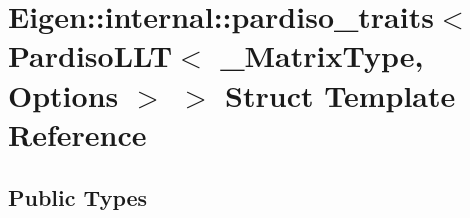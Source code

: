 \hypertarget{struct_eigen_1_1internal_1_1pardiso__traits_3_01_pardiso_l_l_t_3_01___matrix_type_00_01_options_01_4_01_4}{}\section{Eigen\+:\+:internal\+:\+:pardiso\+\_\+traits$<$ Pardiso\+L\+LT$<$ \+\_\+\+Matrix\+Type, Options $>$ $>$ Struct Template Reference}
\label{struct_eigen_1_1internal_1_1pardiso__traits_3_01_pardiso_l_l_t_3_01___matrix_type_00_01_options_01_4_01_4}
\subsection*{Public Types}
